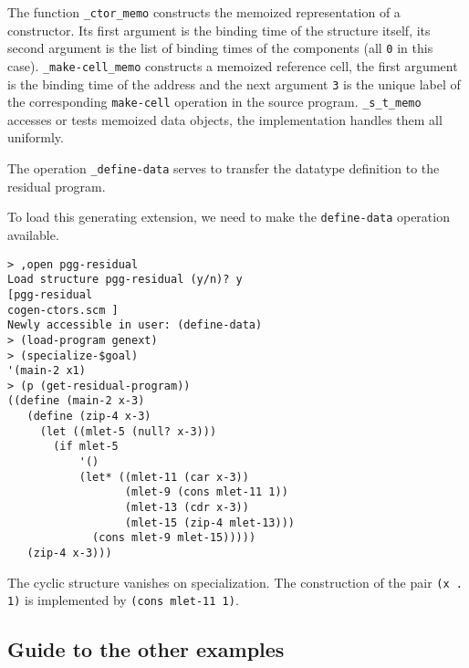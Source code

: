 \documentclass[11pt]{article}
\makeatletter
\newcommand{\indextt}[1]{\index{#1@\texttt{#1}}}
\makeatother
\begin{document}
The function \texttt{\_ctor\_memo} constructs the memoized
representation of a constructor. Its first argument is the binding
time of the structure itself, its second argument is the list of
binding times of the components (all \texttt{0} in this
case). \texttt{\_make-cell\_memo} constructs a memoized reference cell,
the first argument is the binding time of the address and the next
argument \texttt{3} is the unique label of the corresponding
\texttt{make-cell} operation in the source
program. \texttt{\_s\_t\_memo} accesses or tests memoized data
objects, the implementation handles them all uniformly.

The operation \texttt{\_define-data} serves to transfer the datatype
definition to the residual program.

To load this generating extension, we need to make the
\texttt{define-data} operation available.
\begin{small}\indextt{define-data}
\begin{verbatim}
> ,open pgg-residual
Load structure pgg-residual (y/n)? y
[pgg-residual
cogen-ctors.scm ]
Newly accessible in user: (define-data)
> (load-program genext)
> (specialize-$goal)
'(main-2 x1)
> (p (get-residual-program))
((define (main-2 x-3)
   (define (zip-4 x-3)
     (let ((mlet-5 (null? x-3)))
       (if mlet-5
           '()
           (let* ((mlet-11 (car x-3))
                  (mlet-9 (cons mlet-11 1))
                  (mlet-13 (cdr x-3))
                  (mlet-15 (zip-4 mlet-13)))
             (cons mlet-9 mlet-15)))))
   (zip-4 x-3)))
\end{verbatim}
\end{small}
The cyclic structure vanishes on specialization. The construction of
the pair \texttt{(x . 1)} is implemented by \texttt{(cons mlet-11 1)}.


\subsection{Guide to the other examples}
\label{sec:guide}
\end{document}
